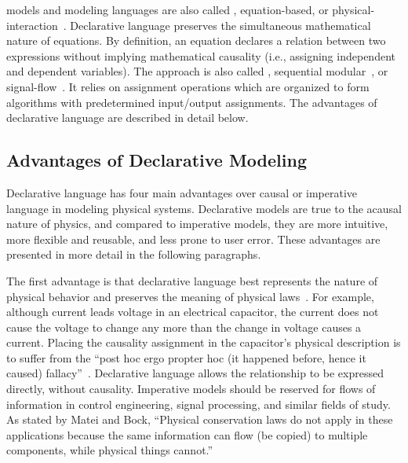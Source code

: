 \emph{} models and modeling languages are also called \emph{}, equation-based, or physical-interaction~\cite{Matei2012}.  Declarative language preserves the simultaneous mathematical nature of equations.  By definition, an equation declares a relation between two expressions without implying mathematical causality (i.e., assigning independent and dependent variables).  The \emph{} approach is also called \emph{}, sequential modular~\cite{Westerberg1994}, or signal-flow~\cite{Matei2012}.  It relies on assignment operations which are organized to form algorithms with predetermined input\slash{}output assignments.  The advantages of declarative language are described in detail below.


\subsection{Advantages of Declarative Modeling}
\label{sec:DeclarativeAdvantages}

Declarative language has four main advantages over causal or imperative language in modeling physical systems.  Declarative models are true to the acausal nature of physics, and compared to imperative models, they are more intuitive, more flexible and reusable, and less prone to user error.  These advantages are presented in more detail in the following paragraphs.

The first advantage is that declarative language best represents the nature of physical behavior and preserves the meaning of physical laws~\cite{Zenith2006, Willems2007, Cellier1996, Kofranek2008}.  For example, although current leads voltage in an electrical capacitor, the current does not cause the voltage to change any more than the change in voltage causes a current.  Placing the causality assignment in the capacitor's physical description is to suffer from the ``post hoc ergo propter hoc (it happened before, hence it caused) fallacy''~\cite{Willems2007}.  Declarative language allows the relationship to be expressed directly, without causality.  Imperative models should be reserved for flows of information in control engineering, signal processing, and similar fields of study.  As stated by Matei and Bock, ``Physical conservation laws do not apply in these applications because the same information can flow (be copied) to multiple components, while physical things cannot.''~\cite{Matei2012}

